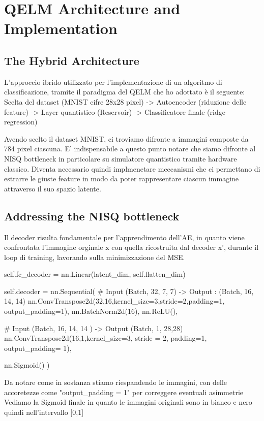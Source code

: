 \documentclass{book}
\begin{document}
\chapter{QELM Architecture and Implementation}

\section{The Hybrid Architecture}
L'approccio ibrido utilizzato per l'implementazione di un algoritmo di classificazione, tramite il paradigma del QELM che ho adottato è il seguente:
Scelta del dataset (MNIST cifre 28x28 pixel) -> Autoencoder (riduzione delle feature) -> Layer quantistico (Reservoir) -> Classificatore finale (ridge regression)

Avendo scelto il dataset MNIST, ci troviamo difronte a immagini composte da 784 pixel ciascuna. E' indispensabile a questo punto notare che siamo difronte al NISQ bottleneck
in particolare su simulatore quantistico tramite hardware classico. Diventa necessario quindi implmenetare meccanismi che ci permettano di estrarre le giuste feature in modo da poter rappresentare ciascun immagine attraverso il suo spazio latente.

\section{Addressing the NISQ bottleneck}

Il decoder risulta fondamentale per l'apprendimento dell'AE, in quanto viene confrontata l'immagine orginale x con quella ricostruita dal decoder x', durante il loop di training, lavorando sulla minimizzazione del MSE.

self.fc_decoder = nn.Linear(latent_dim, self.flatten_dim)

        self.decoder = nn.Sequential(
            # Input (Batch, 32, 7, 7) -> Output : (Batch, 16, 14, 14)
            nn.ConvTranspose2d(32,16,kernel_size=3,stride=2,padding=1, output_padding=1),
            nn.BatchNorm2d(16),
            nn.ReLU(),

            # Input (Batch, 16, 14, 14 ) -> Output (Batch, 1, 28,28)
            nn.ConvTranspose2d(16,1,kernel_size=3, stride = 2, padding=1, output_padding= 1),

            nn.Sigmoid()
        )

Da notare come in sostanza stiamo riespandendo le immagini, con delle accoretezze come "output_padding = 1" per correggere eventuali asimmetrie
Vediamo la Sigmoid finale in quanto le immagini originali sono in bianco e nero quindi nell'intervallo [0,1]
\end{document}
